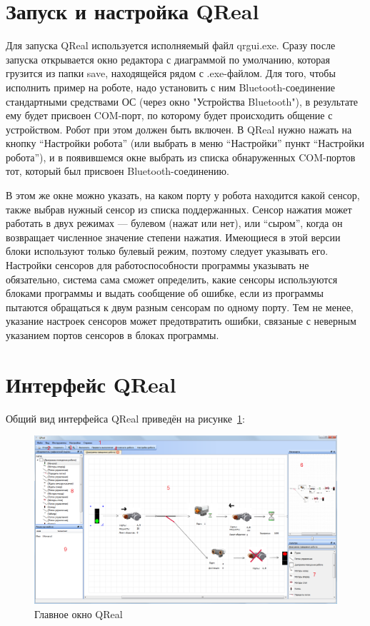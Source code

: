 \documentclass[a4paper,12pt,twoside]{article}
\begin{document}
\section{Запуск и настройка QReal}

Для запуска QReal используется исполняемый файл qrgui.exe. Сразу после запуска открывается окно редактора с диаграммой по умолчанию, которая грузится из папки save, находящейся рядом с .exe-файлом. Для того, чтобы исполнить пример на роботе, надо установить с ним Bluetooth-соединение стандартными средствами ОС (через окно "Устройства Bluetooth"), в результате ему будет присвоен COM-порт, по которому будет происходить общение с устройством. Робот при этом должен быть включен. В QReal нужно нажать на кнопку "`Настройки робота"' (или выбрать в меню "`Настройки"' пункт "`Настройки робота"'), и в появившемся окне выбрать из списка обнаруженных COM-портов тот, который был присвоен Bluetooth-соединению. 

В этом же окне можно указать, на каком порту у робота находится какой сенсор, также выбрав нужный сенсор из списка поддержанных. Сенсор нажатия может работать в двух режимах --- булевом (нажат или нет), или "`сыром"', когда он возвращает численное значение степени нажатия. Имеющиеся в этой версии блоки используют только булевый режим, поэтому следует указывать его. Настройки сенсоров для работоспособности программы указывать не обязательно, система сама сможет определить, какие сенсоры используются блоками программы и выдать сообщение об ошибке, если из программы пытаются обращаться к двум разным сенсорам по одному порту. Тем не менее, указание настроек сенсоров может предотвратить ошибки, связаные с неверным указанием портов сенсоров в блоках программы.

\section{Интерфейс QReal}

Общий вид интерфейса QReal приведён на рисунке~\ref{fig:Interface}:

\begin{figure}[ht]
	\begin{center}
		\includegraphics[width=1.00\textwidth]{Interface.png}
    \caption{Главное окно QReal}
    \label{fig:Interface}
  \end{center}
\end{figure}
\end{document}

